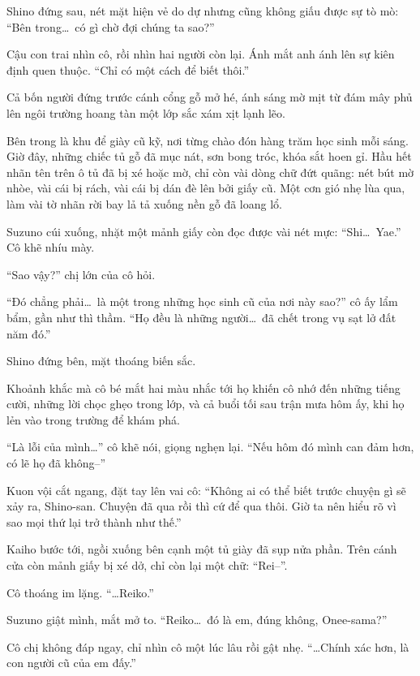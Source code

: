 \documentclass[../main.tex]{subfiles}
\begin{document}
Shino đứng sau, nét mặt hiện vẻ do dự nhưng cũng không giấu được sự tò mò: ``Bên trong\dots\ có gì chờ đợi chúng ta sao?''

Cậu con trai nhìn cô, rồi nhìn hai người còn lại.
Ánh mắt anh ánh lên sự kiên định quen thuộc. ``Chỉ có một cách để biết thôi.''

Cả bốn người đứng trước cánh cổng gỗ mở hé, ánh sáng mờ mịt từ đám mây phủ lên ngôi trường hoang tàn một lớp sắc xám xịt lạnh lẽo.

\ct

Bên trong là khu để giày cũ kỹ, nơi từng chào đón hàng trăm học sinh mỗi sáng. Giờ đây, những chiếc tủ gỗ đã mục nát, sơn bong tróc, khóa sắt hoen gỉ. Hầu hết nhãn tên trên ô tủ đã bị xé hoặc mờ, chỉ còn vài dòng chữ đứt quãng: nét bút mờ nhòe, vài cái bị rách, vài cái bị dán đè lên bởi giấy cũ. Một cơn gió nhẹ lùa qua, làm vài tờ nhãn rời bay lả tả xuống nền gỗ đã loang lổ.


Suzuno cúi xuống, nhặt một mảnh giấy còn đọc được vài nét mực: ``Shi\dots\ Yae.'' Cô khẽ nhíu mày.

``Sao vậy?'' chị lớn của cô hỏi.

``Đó chẳng phải\dots\ là một trong những học sinh cũ của nơi này sao?'' cô ấy lẩm bẩm, gần như thì thầm. ``Họ đều là những người\dots\ đã chết trong vụ sạt lở đất năm đó.''

Shino đứng bên, mặt thoáng biến sắc.

Khoảnh khắc mà cô bé mắt hai màu nhắc tới họ khiến cô nhớ đến những tiếng cười, những lời chọc ghẹo trong lớp, và cả buổi tối sau trận mưa hôm ấy, khi họ lẻn vào trong trường để khám phá.

``Là lỗi của mình\dots'' cô khẽ nói, giọng nghẹn lại. ``Nếu hôm đó mình can đảm hơn, có lẽ họ đã không--''

Kuon vội cắt ngang, đặt tay lên vai cô: ``Không ai có thể biết trước chuyện gì sẽ xảy ra, Shino-san. Chuyện đã qua rồi thì cứ để qua thôi. Giờ ta nên hiểu rõ vì sao mọi thứ lại trở thành như thế.''

Kaiho bước tới, ngồi xuống bên cạnh một tủ giày đã sụp nửa phần. Trên cánh cửa còn mảnh giấy bị xé dở, chỉ còn lại một chữ: ``Rei--''.

Cô thoáng im lặng. ``\dots Reiko.''

Suzuno giật mình, mắt mở to. ``Reiko\dots\ đó là em, đúng không, Onee-sama?''

Cô chị không đáp ngay, chỉ nhìn cô một lúc lâu rồi gật nhẹ. ``\dots Chính xác hơn, là con người cũ của em đấy.''
\end{document}
